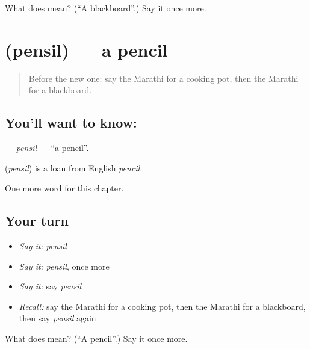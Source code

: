 \begin{tcolorbox}[breakable,colback=teal!4,colframe=teal!35!black,title={Before you move on}]
What does  mean? (\textquotedblleft{}A blackboard\textquotedblright{}.) Say it once more.
\end{tcolorbox}
\section[\texorpdfstring{\mr{पेन्सिल} (pensil)}{पेन्सिल (pensil)}]{ (pensil) — a pencil}

\label{lesson:MR-C134-pensil}



\begin{quote}
Before the new one: say the Marathi for a cooking pot, then the Marathi for a blackboard.
\end{quote}

\subsection*{You'll want to know: }
\textbf{} — \emph{pensil} — \textquotedblleft{}a pencil\textquotedblright{}.

\begin{cousinweb}
\textbf{} (\emph{pensil}) is a loan from English \emph{pencil}.
\end{cousinweb}

\begin{grammarlens}[title={What you've built}]
One more word for this chapter.
\end{grammarlens}

\subsection*{Your turn}
\begin{itemize}
\raggedright
  \item \emph{Say it:} \emph{pensil}
  \item \emph{Say it:} \emph{pensil}, once more
  \item \emph{Say it:} say \emph{pensil}
  \item \emph{Recall:} say the Marathi for a cooking pot, then the Marathi for a blackboard, then say \emph{pensil} again
\end{itemize}

\begin{tcolorbox}[breakable,colback=teal!4,colframe=teal!35!black,title={Before you move on}]
What does  mean? (\textquotedblleft{}A pencil\textquotedblright{}.) Say it once more.
\end{tcolorbox}

